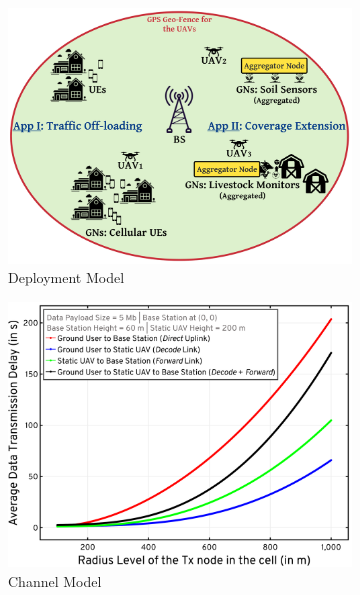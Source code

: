 \documentclass[12pt, draftcls, onecolumn]{IEEEtran}
\theoremstyle{plain}
\theoremstyle{definition}
\theoremstyle{remark}
\begin{document}
\begin{figure} [t]
     \begin{subfigure}{0.325\linewidth}
         \centering
         \includegraphics[width=0.9\linewidth]{figs/Deployment_Model.png}
         \caption{Deployment Model}
         \label{F1}
     \end{subfigure}
     \begin{subfigure}{0.325\linewidth}
         \centering
         \includegraphics[width=0.9\linewidth]{figs/Channel_Model.png}
         \caption{Channel Model}
         \label{F2}
     \end{subfigure}
     \begin{subfigure}{0.325\linewidth}
         \centering

\end{subfigure}
\end{figure}
\end{document}
